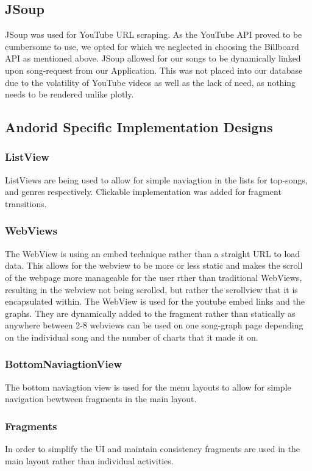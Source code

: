 \documentclass{article}
\begin{document}
\subsection*{JSoup}
JSoup was used for YouTube URL scraping.
As the YouTube API proved to be cumbersome to use, we opted for which we neglected in choosing the Billboard API as mentioned above.
JSoup allowed for our songs to be dynamically linked upon song-request from our Application.
This was not placed into our database due to the volatility of YouTube videos as well as the lack of need, as nothing needs to be rendered unlike plotly.
\subsection*{Andorid Specific Implementation Designs}

\subsubsection*{ListView}
ListViews are being used to allow for simple naviagtion in the lists for top-songs, and genres respectively. Clickable implementation was added for fragment transitions.

\subsubsection*{WebViews}
The WebView is using an embed technique rather than a straight URL to load data. 
This allows for the webview to be more or less static and makes the scroll of the webpage more manageable for the user rther than traditional WebViews,
resulting in the webview not being scrolled, but rather the scrollview that it is encapsulated within.
The WebView is used for the youtube embed links and the graphs. 
They are dynamically added to the fragment rather than statically as anywhere between 2-8 webviews can be used on one song-graph page depending on the individual
song and the number of charts that it made it on. 
\subsubsection*{BottomNaviagtionView}
The bottom naviagtion view is used for the menu layouts to allow for simple navigation bewtween fragments in the main layout.
\subsubsection*{Fragments}
In order to simplify the UI and maintain consistency fragments are used in the main layout rather than individual activities. 
\end{document}
